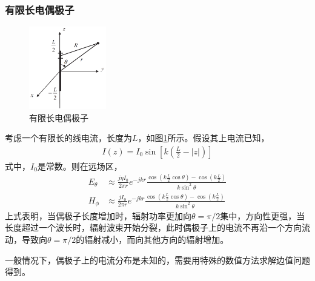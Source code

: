 \documentclass{article}
\numberwithin{equation}{section}
\begin{document}
\subsubsection{有限长电偶极子}
\begin{figure}[ht]
    \centering
    \includegraphics[width=0.3\textwidth]{有限长电偶极子.PNG}
    \caption{有限长电偶极子}
    \label{fig:fig2}
\end{figure}
考虑一个有限长的线电流，长度为$L$，如图\ref{fig:fig2}所示。假设其上电流已知，
\begin{align}
    \label{eq:eq132}
    I(z)=I_0\sin\left[k\left(\frac{L}{2}-\left|z\right|\right)\right]
\end{align}
式中，$I_0$是常数。则在远场区，
\begin{align}
    \label{eq:eq133}
    E_{\theta}&\approx\frac{j\eta I_0}{2\pi r}e^{-jkr}\frac{\cos\left(k\frac{L}{2}\cos\theta\right)-\cos\left(k\frac{L}{2}\right)}{k\sin^2\theta} \\
    \label{eq:eq134}
    H_{\phi}&\approx\frac{jI_0}{2\pi r}e^{-jkr}\frac{\cos\left(k\frac{L}{2}\cos\theta\right)-\cos\left(k\frac{L}{2}\right)}{k\sin^2\theta}
\end{align}
上式表明，当偶极子长度增加时，辐射功率更加向$\theta=\pi /2$集中，方向性更强，当长度超过一个波长时，辐射波束开始分裂，此时偶极子上的电流不再沿一个方向流动，导致向$\theta=\pi /2$的辐射减小，而向其他方向的辐射增加。
\par
一般情况下，偶极子上的电流分布是未知的，需要用特殊的数值方法求解边值问题得到。
\end{document}
